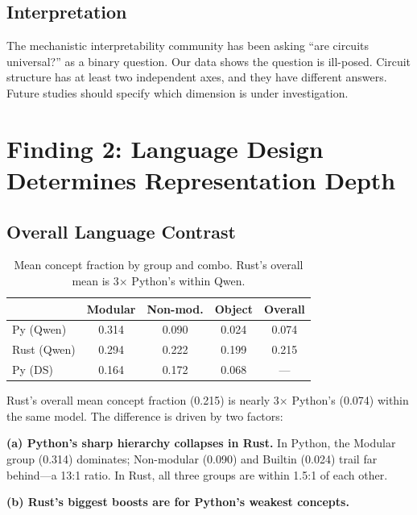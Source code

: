\documentclass[11pt]{article}
\begin{document}
\subsection{Interpretation}

The mechanistic interpretability community has been asking ``are circuits universal?'' as a binary question. Our data shows the question is ill-posed. Circuit structure has at least two independent axes, and they have different answers. Future studies should specify which dimension is under investigation.

\section{Finding 2: Language Design Determines Representation Depth}

\subsection{Overall Language Contrast}

\begin{table}[h]
\centering
\small
\begin{tabular}{lcccc}
\toprule
 & Modular & Non-mod. & Object & Overall \\
\midrule
Py (Qwen)  & 0.314 & 0.090 & 0.024 & 0.074 \\
Rust (Qwen) & 0.294 & 0.222 & 0.199 & 0.215 \\
Py (DS)    & 0.164 & 0.172 & 0.068 & --- \\
\bottomrule
\end{tabular}
\caption{Mean concept fraction by group and combo. Rust's overall mean is 3$\times$ Python's within Qwen.}
\label{tab:groupmeans}
\end{table}

Rust's overall mean concept fraction (0.215) is nearly 3$\times$ Python's (0.074) within the same model. The difference is driven by two factors:

\textbf{(a) Python's sharp hierarchy collapses in Rust.} In Python, the Modular group (0.314) dominates; Non-modular (0.090) and Builtin (0.024) trail far behind---a 13:1 ratio. In Rust, all three groups are within 1.5:1 of each other.

\textbf{(b) Rust's biggest boosts are for Python's weakest concepts.}
\end{document}
